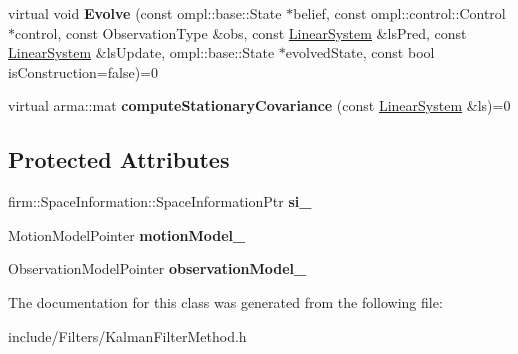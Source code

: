 \begin{DoxyCompactItemize}
\item 
\hypertarget{class_kalman_filter_method_a8a13cf9a962588fbd3441726b7b95e77}{virtual void {\bfseries \-Evolve} (const ompl\-::base\-::\-State $\ast$belief, const ompl\-::control\-::\-Control $\ast$control, const \-Observation\-Type \&obs, const \hyperlink{class_linear_system}{\-Linear\-System} \&ls\-Pred, const \hyperlink{class_linear_system}{\-Linear\-System} \&ls\-Update, ompl\-::base\-::\-State $\ast$evolved\-State, const bool is\-Construction=false)=0}\label{class_kalman_filter_method_a8a13cf9a962588fbd3441726b7b95e77}

\item 
\hypertarget{class_kalman_filter_method_a8f9d8ae8cf4e3bd0138d731bd2539441}{virtual arma\-::mat {\bfseries compute\-Stationary\-Covariance} (const \hyperlink{class_linear_system}{\-Linear\-System} \&ls)=0}\label{class_kalman_filter_method_a8f9d8ae8cf4e3bd0138d731bd2539441}

\end{DoxyCompactItemize}
\subsection*{\-Protected \-Attributes}
\begin{DoxyCompactItemize}
\item 
\hypertarget{class_kalman_filter_method_a9a2355339d83656f5db7c86a60d12822}{firm\-::\-Space\-Information\-::\-Space\-Information\-Ptr {\bfseries si\-\_\-}}\label{class_kalman_filter_method_a9a2355339d83656f5db7c86a60d12822}

\item 
\hypertarget{class_kalman_filter_method_a5969ade2e4d4f70a1cccc2f2f2bf4bb3}{\-Motion\-Model\-Pointer {\bfseries motion\-Model\-\_\-}}\label{class_kalman_filter_method_a5969ade2e4d4f70a1cccc2f2f2bf4bb3}

\item 
\hypertarget{class_kalman_filter_method_a43191b745846715c66854634ba58e85c}{\-Observation\-Model\-Pointer {\bfseries observation\-Model\-\_\-}}\label{class_kalman_filter_method_a43191b745846715c66854634ba58e85c}

\end{DoxyCompactItemize}


\-The documentation for this class was generated from the following file\-:\begin{DoxyCompactItemize}
\item 
include/\-Filters/\-Kalman\-Filter\-Method.\-h\end{DoxyCompactItemize}
